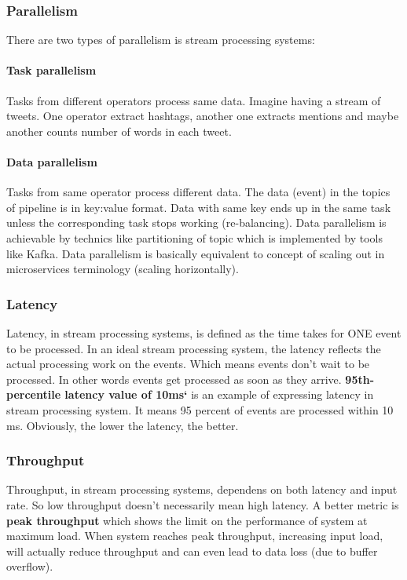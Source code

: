 \documentclass[a4]{report}
\begin{document}
        \subsubsection{Parallelism}
        There are two types of parallelism is stream processing systems:
        \paragraph{Task parallelism}
        Tasks from different operators process same data.
        Imagine having a stream of tweets.
        One operator extract hashtags, another one extracts mentions and maybe another counts number of words in each
        tweet.

        \paragraph{Data parallelism}
        Tasks from same operator process different data.
        The data (event) in the topics of pipeline is in key:value format.
        Data with same key ends up in the same task unless the corresponding task stops working (re-balancing).
        Data parallelism is achievable by technics like partitioning of topic which is implemented by tools like Kafka.
        Data parallelism is basically equivalent to concept of scaling out in microservices terminology (scaling
        horizontally).

        \subsubsection{Latency}
        Latency, in stream processing systems, is defined as the time takes for ONE event to be processed.
        In an ideal stream processing system, the latency reflects the actual processing work on the events.
        Which means events don't wait to be processed.
        In other words events get processed as soon as they arrive.
        \textbf{95th-percentile latency value of 10ms`} is an example of expressing latency in stream processing system.
        It means 95 percent of events are processed within 10 ms.
        Obviously, the lower the latency, the better.

        \subsubsection{Throughput}
        Throughput, in stream processing systems, dependens on both latency and input rate.
        So low throughput doesn't necessarily mean high latency.
        A better metric is \textbf{peak throughput} which shows the limit on the performance of system at maximum load.
        When system reaches peak throughput, increasing input load, will actually reduce throughput and can even lead to
        data loss (due to buffer overflow).
\end{document}
